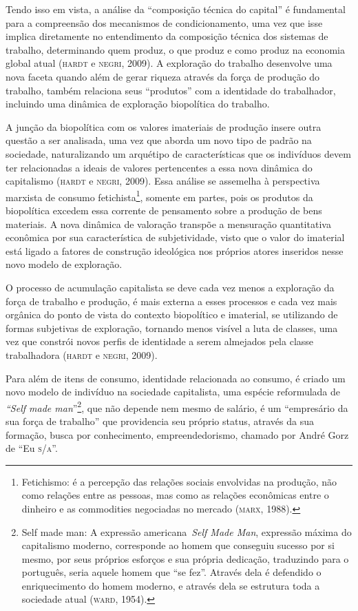 Tendo isso em vista, a análise da ``composição técnica do capital'' é
fundamental para a compreensão dos mecanismos de condicionamento, uma
vez que isse implica diretamente no entendimento da composição técnica
dos sistemas de trabalho, determinando quem produz, o que produz e como
produz na economia global atual (\textsc{hardt} e \textsc{negri}, 2009). A exploração do
trabalho desenvolve uma nova faceta quando além de gerar riqueza através
da força de produção do trabalho, também relaciona seus ``produtos'' com
a identidade do trabalhador, incluindo uma dinâmica de exploração
biopolítica do trabalho.

A junção da biopolítica com os valores imateriais de produção insere
outra questão a ser analisada, uma vez que aborda um novo tipo de padrão
na sociedade, naturalizando um arquétipo de características que os
indivíduos devem ter relacionadas a ideais de valores pertencentes a
essa nova dinâmica do capitalismo (\textsc{hardt} e \textsc{negri}, 2009). Essa análise
se assemelha à perspectiva marxista de consumo fetichista\footnote{Fetichismo:
  é a percepção das relações sociais envolvidas na produção, não como
  relações entre as pessoas, mas como as relações econômicas entre o
  dinheiro e as commodities negociadas no mercado (\textsc{marx}, 1988).},
somente em partes, pois os produtos da biopolítica excedem essa corrente
de pensamento sobre a produção de bens materiais. A nova dinâmica de
valoração transpõe a mensuração quantitativa econômica por sua
característica de subjetividade, visto que o valor do imaterial está
ligado a fatores de construção ideológica nos próprios atores inseridos
nesse novo modelo de exploração.

O processo de acumulação capitalista se deve cada vez menos a exploração
da força de trabalho e produção, é mais externa a esses processos e cada
vez mais orgânica do ponto de vista do contexto biopolítico e imaterial,
se utilizando de formas subjetivas de exploração, tornando menos visível
a luta de classes, uma vez que constrói novos perfis de identidade a
serem almejados pela classe trabalhadora (\textsc{hardt} e \textsc{negri}, 2009).

Para além de itens de consumo, identidade relacionada ao consumo, é
criado um novo modelo de indivíduo na sociedade capitalista, uma espécie
reformulada de \emph{``Self made man}''\footnote{Self made man: A
  expressão americana~\emph{Self Made Man}, expressão máxima do
  capitalismo moderno, corresponde ao homem que conseguiu sucesso por si
  mesmo, por seus próprios esforços e sua própria dedicação, traduzindo
  para o português, seria aquele homem que ``se fez''. Através dela é
  defendido o enriquecimento do homem moderno, e através dela se
  estrutura toda a sociedade atual (\textsc{ward}, 1954).}, que não
depende nem mesmo de salário, é um ``empresário da sua força de
trabalho'' que providencia seu próprio status, através da sua formação,
busca por conhecimento, empreendedorismo, chamado por André Gorz de ``Eu
\textsc{s}/\textsc{a}''.

